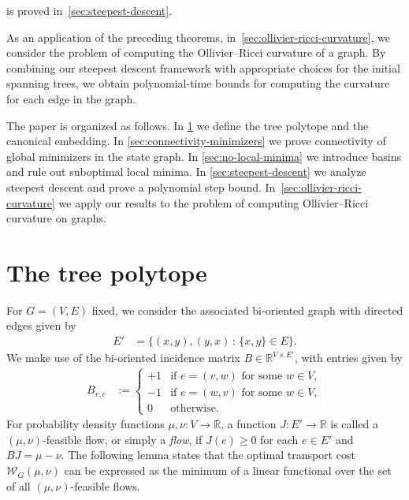 \documentclass[11pt,a4paper]{article}
\newcommand{\wass}{{\mathcal{W}}}
\begin{document}
     is proved in~\cref{sec:steepest-descent}.

    As an application of the preceding theorems, in~\cref{sec:ollivier-ricci-curvature}, we consider the problem of computing the Ollivier--Ricci curvature of a graph. By combining our steepest descent framework with appropriate choices for the initial spanning trees, we obtain polynomial-time bounds for computing the curvature for each edge in the graph.

    The paper is organized as follows. In \cref{sec:flow-polytope} we define the tree polytope and the canonical embedding. In \cref{sec:connectivity-minimizers} we prove connectivity of global minimizers in the state graph. In \cref{sec:no-local-minima} we introduce basins and rule out suboptimal local minima. In \cref{sec:steepest-descent} we analyze steepest descent and prove a polynomial step bound. In~\cref{sec:ollivier-ricci-curvature} we apply our results to the problem of computing Ollivier--Ricci curvature on graphs. 

    \section{The tree polytope}\label{sec:flow-polytope}

    For $G=(V,E)$ fixed, we consider the associated bi-oriented graph with directed edges given by
        \begin{align}\label{eq:bi-oriented-edges}
            E' &= \{(x,y), (y,x) \,:\, \{x,y\}\in E\}.
        \end{align}
    We make use of the bi-oriented incidence matrix $B\in\mathbb{R}^{V\times E'}$, with entries given by
        \begin{align*}
            B_{v, e} &:= \begin{cases}
                +1 & \text{if } e = (v,w) \text{ for some }w\in V,\\
                -1 & \text{if } e = (w,v) \text{ for some }w\in V,\\
                0 & \text{otherwise}.
            \end{cases}
        \end{align*}
    For probability density functions $\mu,\nu:V\to\mathbb{R}$, a function $J:E'\to\mathbb{R}$ is called a $(\mu,\nu)$-feasible flow, or simply a \emph{flow}, if $J(e)\ge 0$ for each $e\in E'$ and $BJ = \mu-\nu$. The following lemma states that the optimal transport cost $\wass_G(\mu,\nu)$ can be expressed as the minimum of a linear functional over the set of all $(\mu,\nu)$-feasible flows.
\end{document}
